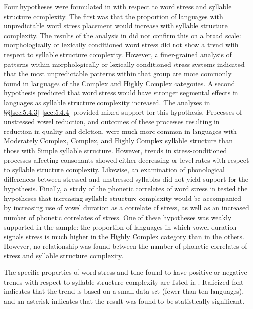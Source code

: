 Four hypotheses were formulated in  with respect to word stress and syllable structure complexity. The first was that the proportion of languages with unpredictable word stress placement would increase with syllable structure complexity. The results of the analysis in  did not confirm this on a broad scale: morphologically or lexically conditioned word stress did not show a trend with respect to syllable structure complexity. However, a finer-grained analysis of patterns within morphologically or lexically conditioned stress systems indicated that the most unpredictable patterns within that group are more commonly found in languages of the Complex and Highly Complex categories. A second hypothesis predicted that word stress would have stronger segmental effects in languages as syllable structure complexity increased. The analyses in §§\ref{sec:5.4.3}--\ref{sec:5.4.4} provided mixed support for this hypothesis. Processes of unstressed vowel reduction, and outcomes of these processes resulting in reduction in quality and deletion, were much more common in languages with Moderately Complex, Complex, and Highly Complex syllable structure than those with Simple syllable structure. However, trends in stress-conditioned processes affecting consonants showed either decreasing or level rates with respect to syllable structure complexity. Likewise, an examination of phonological differences between stressed and unstressed syllables did not yield support for the hypothesis. Finally, a study of the phonetic correlates of word stress in  tested the hypotheses that increasing syllable structure complexity would be accompanied by increasing use of vowel duration as a correlate of stress, as well as an increased number of phonetic correlates of stress. One of these hypotheses was weakly supported in the sample: the proportion of languages in which vowel duration signals stress is much higher in the Highly Complex category than in the others. However, no relationship was found between the number of phonetic correlates of stress and syllable structure complexity.

  The specific properties of word stress and tone found to have positive or negative trends with respect to syllable structure complexity are listed in . Italicized font indicates that the trend is based on a small data set (fewer than ten languages), and an asterisk indicates that the result was found to be statistically significant.

